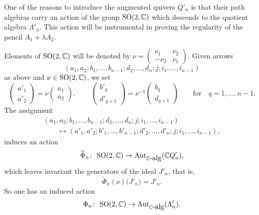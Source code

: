 \documentclass[pdftex]{sigma}
\numberwithin{equation}{section}
\begin{document}
One of the reasons to introduce the augmented quivers $Q'_{n}$ is that their path algebras carry
an action of the group ${\rm SO}(2, \mathbb{C})$ which descends to the quotient algebra $\Lambda'_{n}$. This
action will be instrumental in proving the regularity of the pencil $A_1 + \lambda A_2$.

Elements of ${\rm SO}(2, \mathbb{C})$ will be denoted by $\nu= \left(\begin{smallmatrix} \nu_1 & \nu_2 \\ -\nu_2 & \nu_1\end{smallmatrix}\right)$. Given arrows
\[(a_{1},a_{2};b_{1},\dots,b_{n-1};d_{2},\dots,d_{n};j;i_{1},\dots,i_{n-1})\]
as above and $\nu\in {\rm SO}(2,\mathbb{C})$, we set
\begin{equation*}
\begin{pmatrix}a'_{1} \\ a'_{2} \end{pmatrix} = \nu \begin{pmatrix}a_{1} \\ a_{2} \end{pmatrix},
\qquad
\begin{pmatrix}b'_{q} \\ d'_{q+1} \end{pmatrix} = \nu^{-1}\begin{pmatrix}b_{q} \\ d_{q+1} \end{pmatrix}
\qquad\text{for}\quad q=1,\dots,n-1 .
\end{equation*}
The assignment
\begin{gather*}
(a_{1},a_{2};b_{1},\dots,b_{n-1};d_{2},\dots,d_{n};j;i_{1},\dots,i_{n-1}) \\ \qquad{} \longmapsto(a'_{1},a'_{2};b'_{1},\dots,b'_{n-1};d'_{2},\dots,d'_{n};j;i_{1},\dots,i_{n-1}) ,
\end{gather*}
induces an action
\[\widetilde\Phi_n \colon \ {\rm SO}(2,\mathbb{C}) \to \operatorname{Aut}_{\mathbb{C}\hbox{-alg}} (\mathbb{C} Q'_{n}) ,\]
which leaves invariant the generators of the ideal $J'_{n}$, that is,
\begin{equation*}
\widetilde{\Phi}_{n} (\nu) \bigl(J'_{n}\bigr) =J'_{n} .
\end{equation*}
So one has an induced action
\[\Phi_n \colon \ {\rm SO}(2,\mathbb{C}) \to \operatorname{Aut}_{\mathbb{C}\hbox{-alg}} (\Lambda'_{n}) .\]
\end{document}
